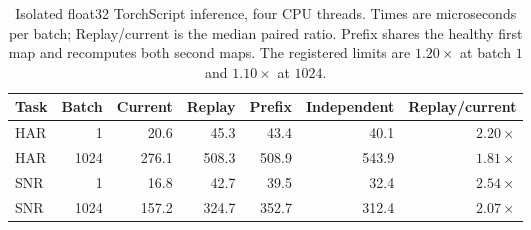 \begin{table}[h]
\centering
\caption{Isolated float32 TorchScript inference, four CPU threads. Times
are microseconds per batch; Replay/current is the median paired ratio.
Prefix shares the healthy first map and recomputes both second maps.
The registered limits are $1.20\times$ at batch $1$ and $1.10\times$ at $1024$.}
\label{tab:replay_cost}
\small
\begin{tabular}{lrrrrrr}
\toprule
Task & Batch & Current & Replay & Prefix & Independent & Replay/current \\
\midrule
HAR & 1 & 20.6 & 45.3 & 43.4 & 40.1 & $2.20\times$ \\
HAR & 1024 & 276.1 & 508.3 & 508.9 & 543.9 & $1.81\times$ \\
SNR & 1 & 16.8 & 42.7 & 39.5 & 32.4 & $2.54\times$ \\
SNR & 1024 & 157.2 & 324.7 & 352.7 & 312.4 & $2.07\times$ \\
\bottomrule
\end{tabular}
\end{table}
